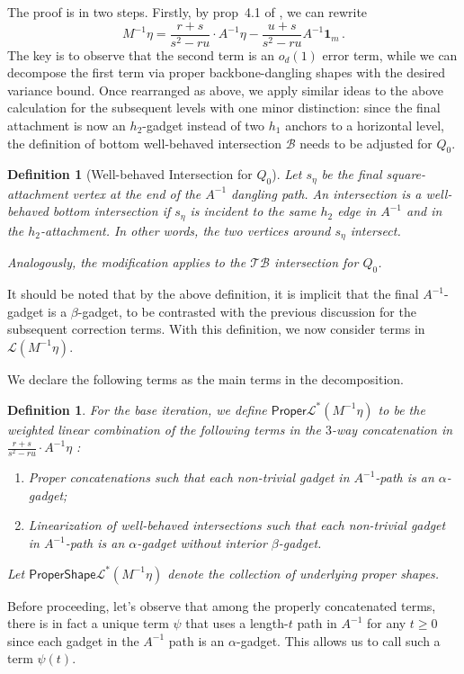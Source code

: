 \documentclass[12pt]{article}
\def \al {\alpha}
\def\1{\bm{1}}
\newtheorem{definition}[theorem]{Definition}
\begin{document}
The proof is in two steps. Firstly, by prop~4.1 of \cite{HKPX23}, we can rewrite \[
M^{-1}\eta = \frac{r+s}{s^2-ru} \cdot A^{-1}\eta - \frac{u+s}{s^2-ru} A^{-1} \1_m\,.
 \]
 The key is to observe that the second term is an $o_d(1)$ error term, while we can decompose the first term via proper backbone-dangling shapes with the desired variance bound. Once rearranged as above, we apply similar ideas to the above calculation for the subsequent levels with one minor distinction: since the final attachment is now an $h_2$-gadget instead of two $h_1$ anchors to a horizontal level, the definition of bottom well-behaved intersection $\mathcal{B}$ needs to be adjusted for $Q_0$.
 \begin{definition}[Well-behaved  Intersection for $Q_0$] Let $s_\eta$ be the final square-attachment vertex at the end of the $A^{-1}$ dangling path. An intersection is a well-behaved bottom intersection if
 	  $s_{\eta}$ is incident to the same $h_2$ edge in $A^{-1}$ and in the $h_2$-attachment. In other words, the two vertices around $s_\eta$ intersect.

 	  Analogously, the modification applies to the $\mathcal{TB}$ intersection for $Q_0$.
 \end{definition}
 It should be noted that by the above definition, it is implicit that the final $A^{-1}$-gadget is a $\beta$-gadget, to be contrasted with the previous discussion for the subsequent correction terms. With this definition, we now consider terms in $\mathcal{L}(M^{-1}\eta)$.
 
 We declare the following terms as the main terms in the decomposition. \begin{definition}	 For the base iteration, we define $
	\mathsf{Proper} \mathcal{L}^*(M^{-1}\eta )$ to be the weighted linear combination of the following terms in the $3$-way concatenation in $\frac{r+s}{s^2-ru} \cdot A^{-1}\eta$ :
	\begin{enumerate}
		\item Proper concatenations such that each non-trivial gadget in $A^{-1}$-path is an $\al$-gadget;
		\item Linearization of well-behaved intersections such that each non-trivial gadget in $A^{-1}$-path is an $\al$-gadget without interior $\beta$-gadget.
	\end{enumerate}
	Let $\mathsf{ProperShape} \mathcal{L}^*(M^{-1}\eta )$ denote the collection of underlying proper shapes.
\end{definition}

Before proceeding, let's observe that among the properly concatenated terms, there is in fact a unique term $\psi$ that uses a length-$t$ path in $A^{-1}$ for any $t\geq 0$ since each gadget in the $A^{-1}$ path is an $\al$-gadget.  This allows us to call such a term $\psi(t)$.
\end{document}
